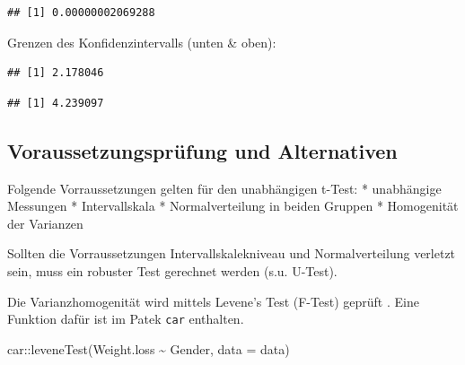 \documentclass[
]{book}
\newenvironment{Shaded}{\begin{snugshade}}{\end{snugshade}}
\newcommand{\AttributeTok}[1]{\textcolor[rgb]{0.77,0.63,0.00}{#1}}
\newcommand{\DecValTok}[1]{\textcolor[rgb]{0.00,0.00,0.81}{#1}}
\newcommand{\FunctionTok}[1]{\textcolor[rgb]{0.00,0.00,0.00}{#1}}
\newcommand{\NormalTok}[1]{#1}
\newcommand{\SpecialCharTok}[1]{\textcolor[rgb]{0.00,0.00,0.00}{#1}}
\begin{document}
\begin{verbatim}
## [1] 0.00000002069288
\end{verbatim}

Grenzen des Konfidenzintervalls (unten \& oben):

\begin{Shaded}
\end{Shaded}

\begin{verbatim}
## [1] 2.178046
\end{verbatim}

\begin{Shaded}
\end{Shaded}

\begin{verbatim}
## [1] 4.239097
\end{verbatim}

\hypertarget{voraussetzungspruxfcfung-und-alternativen}{%
\subsection{Voraussetzungsprüfung und Alternativen}\label{voraussetzungspruxfcfung-und-alternativen}}

Folgende Vorraussetzungen gelten für den unabhängigen t-Test:
* unabhängige Messungen
* Intervallskala
* Normalverteilung in beiden Gruppen
* Homogenität der Varianzen

Sollten die Vorraussetzungen Intervallskalekniveau und Normalverteilung verletzt sein, muss ein robuster Test gerechnet werden (s.u. U-Test).

Die Varianzhomogenität wird mittels Levene's Test (F-Test) geprüft \citet{levene1960robust}. Eine Funktion dafür ist im Patek \texttt{car} enthalten.

\begin{Shaded}
\begin{Highlighting}[]
\NormalTok{car}\SpecialCharTok{::}\FunctionTok{leveneTest}\NormalTok{(Weight.loss }\SpecialCharTok{\textasciitilde{}}\NormalTok{ Gender, }\AttributeTok{data =}\NormalTok{ data)}
\end{Highlighting}
\end{Shaded}
\end{document}
